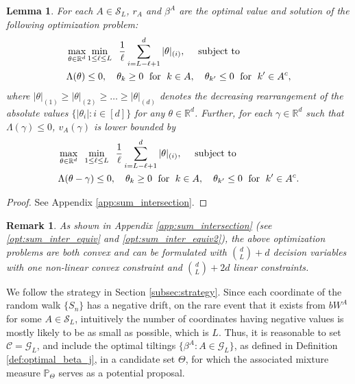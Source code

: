 \documentclass[aap,preprint]{imsart}
\newcommand{\Pro}{{\mathbb{P}}}
\newcommand{\bR}{{\mathbb{R}}}
\theoremstyle{plain}
\newtheorem{lemma}[theorem]{Lemma}
\newtheorem{remark}{Remark}[section]
\theoremstyle{definition}
\begin{document}
\begin{lemma}\label{lemma:sum_intersection_opt_probs}
For each $A \in \mathcal{S}_L$, $r_A$ and $\beta^A$ are the optimal value and solution of the following optimization problem:
\begin{align*}
& \max_{\theta \in \bR^d}    \min_{1 \leq \ell \leq L} \;\; \frac{1}{\ell} \sum_{i = L - \ell + 1}^{d} |\theta|_{(i)}, \quad \textup{ subject to }  \\
& \Lambda(\theta) \leq 0, \quad \theta_k \geq 0 \;\text{ for }\; k \in A, \quad \theta_{k'} \leq 0 \;\text{ for }\; k' \in A^c,
\end{align*}
where  $|\theta|_{(1)} \geq |\theta|_{(2)} \geq \ldots \geq |\theta|_{(d)}$ denotes the decreasing rearrangement of the absolute values  $\{|\theta_i|: i \in [d]\}$ for any $\theta \in \bR^d$. 
Further, for each $\gamma \in \bR^d$ such that $\Lambda(\gamma) \leq 0$, $v_A(\gamma)$ is lower bounded by
\begin{align*}
& \max_{\theta \in \bR^d} \;\;   \min_{1 \leq \ell \leq L} \;\; \frac{1}{\ell} \sum_{i = L - \ell + 1}^{d} |\theta|_{(i)}, \quad \textup{ subject to }  \\
& \Lambda(\theta - \gamma) \leq 0, \quad \theta_k \geq 0\; \text{ for } \;k \in A, \quad \theta_{k'} \leq 0\; \text{ for } \;k' \in A^c.
\end{align*}
\end{lemma}
\begin{proof}
    See Appendix \ref{app:sum_intersection}.
\end{proof}
\begin{remark}\label{remark:sum-intersection_convex}
As shown in Appendix \ref{app:sum_intersection} (see \eqref{opt:sum_inter_equiv} and \eqref{opt:sum_inter_equiv2}), the above optimization problems are both convex and can be formulated with $\binom{d}{L}+d$ decision variables with one non-linear convex constraint and $\binom{d}{L}+2d$ linear constraints.
\end{remark}

We follow the strategy in Section \ref{subsec:strategy}.
Since each coordinate of the random walk $\{S_n\}$ has a negative drift, on the rare event that
it exists from $b W^{A}$ for some $A \in \mathcal{S}_L$, intuitively the number of coordinates having negative values is mostly likely to be as small as possible, which is $L$. Thus, it is reasonable to set $\mathcal{C} = \mathcal{G}_L$, and include the optimal tiltings $\{\beta^{A}: A\in \mathcal{G}_L\}$, as defined in Definition \ref{def:optimal_beta_j}, in a candidate set $\Theta$, for which the associated mixture measure $\Pro_{\Theta}$ serves as a potential proposal.
\end{document}
